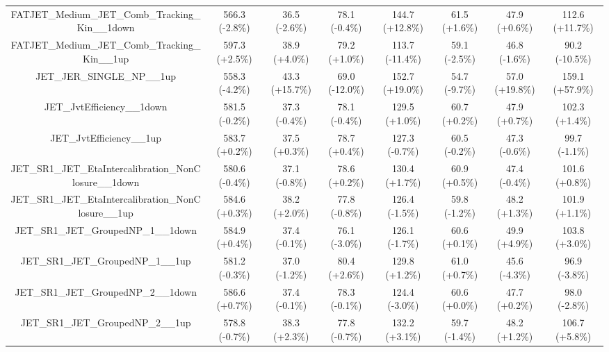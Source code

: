\begin{table}[htbp!]
\begin{tiny}
\begin{center}
\begin{tabular}{c|c|c|c||c|c|c|c}
FATJET\_Medium\_JET\_Comb\_Tracking\_Kin\_\_1down            & 566.3     (-2.8\%) & 36.5      (-2.6\%) & 78.1      (-0.4\%) & 144.7     (+12.8\%) & 61.5      (+1.6\%) & 47.9      (+0.6\%) & 112.6     (+11.7\%) \\ 
FATJET\_Medium\_JET\_Comb\_Tracking\_Kin\_\_1up              & 597.3     (+2.5\%) & 38.9      (+4.0\%) & 79.2      (+1.0\%) & 113.7     (-11.4\%) & 59.1      (-2.5\%) & 46.8      (-1.6\%) & 90.2      (-10.5\%) \\ 
JET\_JER\_SINGLE\_NP\_\_1up                                  & 558.3     (-4.2\%) & 43.3      (+15.7\%) & 69.0      (-12.0\%) & 152.7     (+19.0\%) & 54.7      (-9.7\%) & 57.0      (+19.8\%) & 159.1     (+57.9\%) \\ 
JET\_JvtEfficiency\_\_1down                                  & 581.5     (-0.2\%) & 37.3      (-0.4\%) & 78.1      (-0.4\%) & 129.5     (+1.0\%) & 60.7      (+0.2\%) & 47.9      (+0.7\%) & 102.3     (+1.4\%) \\ 
JET\_JvtEfficiency\_\_1up                                    & 583.7     (+0.2\%) & 37.5      (+0.3\%) & 78.7      (+0.4\%) & 127.3     (-0.7\%) & 60.5      (-0.2\%) & 47.3      (-0.6\%) & 99.7      (-1.1\%) \\ 
JET\_SR1\_JET\_EtaIntercalibration\_NonClosure\_\_1down      & 580.6     (-0.4\%) & 37.1      (-0.8\%) & 78.6      (+0.2\%) & 130.4     (+1.7\%) & 60.9      (+0.5\%) & 47.4      (-0.4\%) & 101.6     (+0.8\%) \\ 
JET\_SR1\_JET\_EtaIntercalibration\_NonClosure\_\_1up        & 584.6     (+0.3\%) & 38.2      (+2.0\%) & 77.8      (-0.8\%) & 126.4     (-1.5\%) & 59.8      (-1.2\%) & 48.2      (+1.3\%) & 101.9     (+1.1\%) \\ 
JET\_SR1\_JET\_GroupedNP\_1\_\_1down                         & 584.9     (+0.4\%) & 37.4      (-0.1\%) & 76.1      (-3.0\%) & 126.1     (-1.7\%) & 60.6      (+0.1\%) & 49.9      (+4.9\%) & 103.8     (+3.0\%) \\ 
JET\_SR1\_JET\_GroupedNP\_1\_\_1up                           & 581.2     (-0.3\%) & 37.0      (-1.2\%) & 80.4      (+2.6\%) & 129.8     (+1.2\%) & 61.0      (+0.7\%) & 45.6      (-4.3\%) & 96.9      (-3.8\%) \\ 
JET\_SR1\_JET\_GroupedNP\_2\_\_1down                         & 586.6     (+0.7\%) & 37.4      (-0.1\%) & 78.3      (-0.1\%) & 124.4     (-3.0\%) & 60.6      (+0.0\%) & 47.7      (+0.2\%) & 98.0      (-2.8\%) \\ 
JET\_SR1\_JET\_GroupedNP\_2\_\_1up                           & 578.8     (-0.7\%) & 38.3      (+2.3\%) & 77.8      (-0.7\%) & 132.2     (+3.1\%) & 59.7      (-1.4\%) & 48.2      (+1.2\%) & 106.7     (+5.8\%) \\ 

\end{tabular}
\end{center}
\end{tiny}
\end{table}
